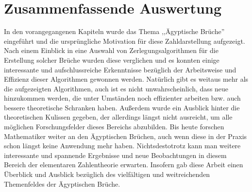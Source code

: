 \section{Zusammenfassende Auswertung}
In den vorangegangenen Kapiteln wurde das Thema ,,Ägyptische Brüche'' eingeführt und die ursprüngliche Motivation für diese Zahldarstellung aufgezeigt. Nach einem Einblick in eine Auswahl von Zerlegungsalgorithmen für die Erstellung solcher Brüche wurden diese verglichen und es konnten einige interessante und aufschlussreiche Erkenntnisse bezüglich der Arbeitsweise und Effizienz dieser Algorithmen gewonnen werden. Natürlich gibt es weitaus mehr als die aufgezeigten Algorithmen, auch ist es nicht unwahrscheinlich, dass neue hinzukommen werden, die unter Umständen noch effizienter arbeiten bzw. auch bessere theoretische Schranken haben. Außerdem wurde ein Ausblick hinter die theoretischen Kulissen gegeben, der allerdings längst nicht ausreicht, um alle möglichen Forschungsfelder dieses Bereichs abzubilden. Bis heute forschen Mathematiker weiter an den Ägyptischen Brüchen, auch wenn diese in der Praxis schon längst keine Anwendung mehr haben. Nichtsdestotrotz kann man weitere interessante und spannende Ergebnisse und neue Beobachtungen in diesem Bereich der elementaren Zahlentheorie erwarten. Insofern gab diese Arbeit einen Überblick und Ausblick bezüglich des vielfältigen und weitreichenden Themenfeldes der Ägyptischen Brüche.